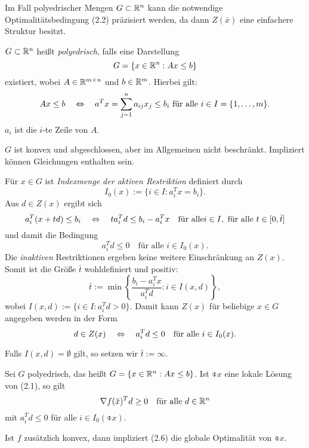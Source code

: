 Im Fall polyedrischer Mengen $G \subset \mathbb{R}^n$ kann die notwendige
Optimalitätsbedingung (2.2) präzisiert werden, da dann $Z(\bar{x})$ eine
einfachere Struktur besitzt.

\begin{defn} %
  $G \subset \mathbb{R}^n$ heißt \emph{polyedrisch}, falls eine Darstellung
  \[ G = \{ x \in \mathbb{R}^n : Ax \le b \} \]
  existiert, wobei $A \in \mathbb{R}^{m \times n}$ und $b \in \mathbb{R}^m$. Hierbei gilt:
  \[ Ax \le b \quad \Leftrightarrow \quad a^T x = \sum_{j=1}^n a_{ij} x_j \le b_i \text{ für alle } i
    \in I = \{ 1, \ldots, m \}. \]
  $a_i$ ist die $i$-te Zeile von $A$.
\end{defn}

\begin{rmrk} %
  $G$ ist konvex und abgeschlossen, aber im Allgemeinen nicht beschränkt.
  Impliziert können Gleichungen enthalten sein.
\end{rmrk}

\begin{defn} %
  Für $x \in G$ ist \emph{Indexmenge der aktiven Restriktion} definiert durch
  \[ I_0(x) := \{ i \in I : a_i^T x = b_i \}. \]
  Aus $d \in Z(x)$ ergibt sich
  \[ a_i^T (x + t d) \le b_i \quad \Leftrightarrow \quad t a_i^T  d \le b_i - a_i^T x \quad
    \text{für alle} i \in I, \text{ für alle } t \in [0, \bar{t}] \]
  und damit die Bedingung
  \[ a_i^T d \le 0 \quad \text{für alle } i \in I_0(x). \]
  Die \emph{inaktiven} Restriktionen ergeben keine weitere Einschränkung an
  $Z(x)$. Somit ist die Größe $\bar{t}$ wohldefiniert und positiv:
  \begin{equation} %
    \bar{t} := \min \left\{ \frac{b_i - a_i^T x}{a_i^T d} : i \in I(x,d)
    \right\},
  \end{equation}
  wobei $I(x,d) := \{ i \in I: a_i^T d > 0 \}$. Damit kann $Z(x)$ für beliebige
  $x \in G$ angegeben werden in der Form
  \begin{equation} %
    d \in Z(x) \qLRq a_i^T d \le 0 \quad \text{für alle } i \in I_0(x).
  \end{equation}
\end{defn}

\begin{rmrk} %
  Falls $I(x,d) = \emptyset$ gilt, so setzen wir $\bar{t} := \infty$.
\end{rmrk}

\begin{flg} %
  Sei $G$ polyedrisch, das heißt $G = \{ x \in \mathbb{R}^n : Ax \le b\}$. Ist
  $\obar{x}$ eine lokale Lösung von (2.1), so gilt
  \begin{equation} %
    \nabla f( \obar{x} )^T d \ge 0 \quad \text{für alle } d \in \real^n
  \end{equation}
  mit $a_i^T d \le 0$ für alle $i \in I_0(\obar{x})$.

  Ist $f$ zusätzlich konvex, dann impliziert (2.6) die globale Optimalität von
  $\obar{x}$.
\end{flg}

